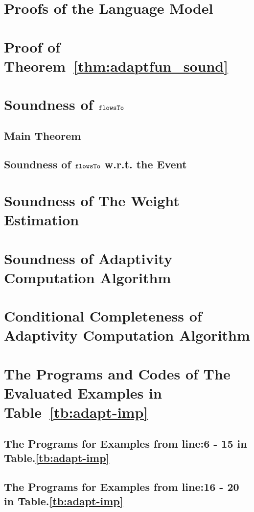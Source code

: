 \section{Proofs of the Language Model}
\label{apdx:lemma_sec123}

\section{Proof of Theorem~\ref{thm:adaptfun_sound}}
\label{apdx:adapt_soundness}

\clearpage
\section{Soundness of $\mathtt{flowsTo}$}
\label{apdx:flowsto_soundness}
\subsection{Main Theorem}

%
\subsection{Soundness of $\mathtt{flowsTo}$ w.r.t. the Event}
\label{apdx:flowsto_event_soundness}

\clearpage
\section{Soundness of The Weight Estimation}
\label{apdx:reachability_soundness}

\clearpage
\section{Soundness of Adaptivity Computation Algorithm}
\label{apdx:adaptalg_soundness}

\section{Conditional Completeness of Adaptivity Computation Algorithm}
\label{apdx:adaptalg_completeness}


\section{The Programs and Codes of The Evaluated Examples in Table~\ref{tb:adapt-imp}}
\label{apdx:evaluated_examples}
\subsection{The Programs for Examples from line:6 - 15 in Table.\ref{tb:adapt-imp}}


\subsection{The Programs for Examples from line:16 - 20 in Table.\ref{tb:adapt-imp}}

